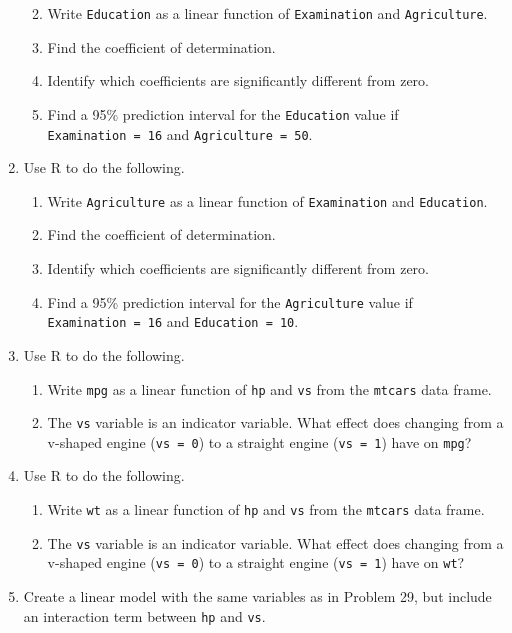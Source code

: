 \documentclass[
]{book}
\providecommand{\tightlist}{%
  \setlength{\itemsep}{0pt}\setlength{\parskip}{0pt}}
\theoremstyle{definition}
\theoremstyle{definition}
\theoremstyle{definition}
\theoremstyle{definition}
\theoremstyle{remark}
\begin{document}
\begin{enumerate}
  \begin{enumerate}
  \def\labelenumii{\alph{enumii}.}
  \tightlist
  \item
    Write \texttt{Education} as a linear function of \texttt{Examination} and \texttt{Agriculture}.
  \item
    Find the coefficient of determination.
  \item
    Identify which coefficients are significantly different from zero.
  \item
    Find a 95\% prediction interval for the \texttt{Education} value if \texttt{Examination\ =\ 16} and \texttt{Agriculture\ =\ 50}.
  \end{enumerate}
\item
  Use R to do the following.

  \begin{enumerate}
  \def\labelenumii{\alph{enumii}.}
  \tightlist
  \item
    Write \texttt{Agriculture} as a linear function of \texttt{Examination} and \texttt{Education}.
  \item
    Find the coefficient of determination.
  \item
    Identify which coefficients are significantly different from zero.
  \item
    Find a 95\% prediction interval for the \texttt{Agriculture} value if \texttt{Examination\ =\ 16} and \texttt{Education\ =\ 10}.
  \end{enumerate}
\item
  Use R to do the following.

  \begin{enumerate}
  \def\labelenumii{\alph{enumii}.}
  \tightlist
  \item
    Write \texttt{mpg} as a linear function of \texttt{hp} and \texttt{vs} from the \texttt{mtcars} data frame.
  \item
    The \texttt{vs} variable is an indicator variable. What effect does changing from a v-shaped engine (\texttt{vs\ =\ 0}) to a straight engine (\texttt{vs\ =\ 1}) have on \texttt{mpg}?
  \end{enumerate}
\item
  Use R to do the following.

  \begin{enumerate}
  \def\labelenumii{\alph{enumii}.}
  \tightlist
  \item
    Write \texttt{wt} as a linear function of \texttt{hp} and \texttt{vs} from the \texttt{mtcars} data frame.
  \item
    The \texttt{vs} variable is an indicator variable. What effect does changing from a v-shaped engine (\texttt{vs\ =\ 0}) to a straight engine (\texttt{vs\ =\ 1}) have on \texttt{wt}?
  \end{enumerate}
\item
  Create a linear model with the same variables as in Problem 29, but include an interaction term between \texttt{hp} and \texttt{vs}.


\end{enumerate}
\end{document}
